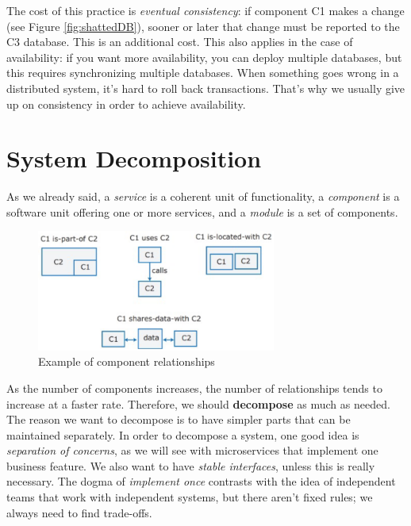 The cost of this practice is \emph{eventual consistency}: if component C1 makes a change (see Figure \ref{fig:shattedDB}), sooner or later that change must be reported to the C3 database. This is an additional cost. This also applies in the case of availability: if you want more availability, you can deploy multiple databases, but this requires synchronizing multiple databases. When something goes wrong in a distributed system, it's hard to roll back transactions. That's why we usually give up on consistency in order to achieve availability.

\newpage

\section{System Decomposition}

As we already said, a \emph{service} is a coherent unit of functionality, a \emph{component} is a software unit offering one or more services, and a \emph{module} is a set of components.

\begin{figure} [H]
    \centering
    \includegraphics[width=0.7\textwidth]{images/SoftwareArchitecture/componentrelationship.png}
    \caption{Example of component relationships}
    \label{fig:componentrelationship}
\end{figure} 

As the number of components increases, the number of relationships tends to increase at a faster rate. Therefore, we should \textbf{decompose} as much as needed. The reason we want to decompose is to have simpler parts that can be maintained separately. In order to decompose a system, one good idea is \emph{separation of concerns}, as we will see with microservices that implement one business feature. We also want to have \emph{stable interfaces}, unless this is really necessary. The dogma of \emph{implement once} contrasts with the idea of independent teams that work with independent systems, but there aren't fixed rules; we always need to find trade-offs.

